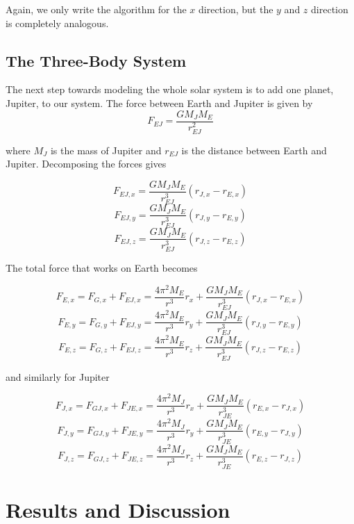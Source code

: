 \documentclass{article}
\begin{document}
Again, we only write the algorithm for the $x$ direction, but the $y$ and $z$ direction is completely analogous.


\subsection{The Three-Body System}

The next step towards modeling the whole solar system is to add one planet, Jupiter, to our system. The force between Earth and Jupiter is given by
$$F_{EJ}=\frac{GM_JM_E}{r_{EJ}^2}$$

where $M_J$ is the mass of Jupiter and $r_{EJ}$ is the distance between Earth and Jupiter. Decomposing the forces gives

$$F_{EJ,x}=\frac{GM_JM_E}{r_{EJ}^3}(r_{J,x}-r_{E,x})$$
$$F_{EJ,y}=\frac{GM_JM_E}{r_{EJ}^3}(r_{J,y}-r_{E,y})$$
$$F_{EJ,z}=\frac{GM_JM_E}{r_{EJ}^3}(r_{J,z}-r_{E,z})$$

The total force that works on Earth becomes

$$F_{E,x}=F_{G,x}+F_{EJ,x}=\frac{4\pi^2M_E}{r^3}r_x+\frac{GM_JM_E}{r_{EJ}^3}(r_{J,x}-r_{E,x})$$
$$F_{E,y}=F_{G,y}+F_{EJ,y}=\frac{4\pi^2M_E}{r^3}r_y+\frac{GM_JM_E}{r_{EJ}^3}(r_{J,y}-r_{E,y})$$
$$F_{E,z}=F_{G,z}+F_{EJ,z}=\frac{4\pi^2M_E}{r^3}r_z+\frac{GM_JM_E}{r_{EJ}^3}(r_{J,z}-r_{E,z})$$

and similarly for Jupiter

$$F_{J,x}=F_{GJ,x}+F_{JE,x}=\frac{4\pi^2M_J}{r^3}r_x+\frac{GM_JM_E}{r_{JE}^3}(r_{E,x}-r_{J,x})$$
$$F_{J,y}=F_{GJ,y}+F_{JE,y}=\frac{4\pi^2M_J}{r^3}r_y+\frac{GM_JM_E}{r_{JE}^3}(r_{E,y}-r_{J,y})$$
$$F_{J,z}=F_{GJ,z}+F_{JE,z}=\frac{4\pi^2M_J}{r^3}r_z+\frac{GM_JM_E}{r_{JE}^3}(r_{E,z}-r_{J,z})$$



\section{Results and Discussion}
\end{document}
